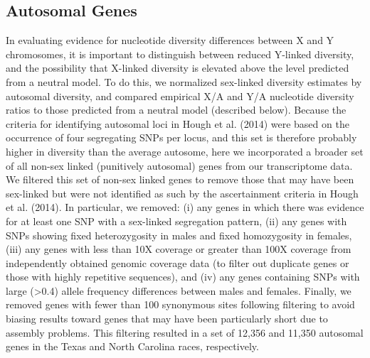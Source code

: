 \documentclass[9pt,twocolumn,twoside]{gsajnl}
\begin{document}
\subsection*{Autosomal Genes} 
In evaluating evidence for nucleotide diversity differences between X and Y chromosomes, it is important to distinguish between reduced Y-linked diversity, and the possibility that X-linked diversity is elevated above the level predicted from a neutral model. To do this, we normalized sex-linked diversity estimates by autosomal diversity, and compared empirical X/A and Y/A nucleotide diversity ratios to those predicted from a neutral model (described below). Because the criteria for identifying autosomal loci in Hough et al. (2014) were based on the occurrence of four segregating SNPs per locus, and this set is therefore probably higher in diversity than the average autosome, here we incorporated a broader set of all non-sex linked (punitively autosomal) genes from our transcriptome data. We filtered this set of non-sex linked genes to remove those that may have been sex-linked but were not identified as such by the ascertainment criteria in Hough et al. (2014). In particular, we removed: (i) any genes in which there was evidence for at least one SNP with a sex-linked segregation pattern, (ii) any genes with SNPs showing fixed heterozygosity in males and fixed homozygosity in females, (iii) any genes with less than 10X coverage or greater than 100X coverage from independently obtained genomic coverage data (to filter out duplicate genes or those with highly repetitive sequences), and (iv) any genes containing SNPs with large (>0.4) allele frequency differences between males and females. Finally, we removed genes with fewer than 100 synonymous sites following filtering to avoid biasing results toward genes that may have been particularly short due to assembly problems. This filtering resulted in a set of 12,356 and 11,350 autosomal genes in the Texas and North Carolina races, respectively.
\end{document}
